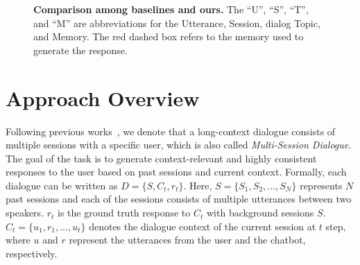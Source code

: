 \documentclass[authoryear,preprint,review,12pt]{elsarticle}
\begin{document}
\begin{figure}[t]
{ }\hspace{.05in}
 \caption{\textbf{Comparison among baselines and ours.} The ``U'', ``S'', ``T'', and ``M'' are abbreviations for the Utterance, Session, dialog Topic, and Memory. The red dashed box refers to the memory used to generate the response.}
 \label{fig:com}
 \end{figure}
\section{Approach Overview}
Following previous works~\citep{xu-etal-2022-beyond, bae-etal-2022-keep}, we denote that a long-context dialogue consists of multiple sessions with a specific user, which is also called \textit{Multi-Session Dialogue}. The goal of the task is to generate context-relevant and highly consistent responses to the user based on past sessions and current context. Formally, each dialogue can be written as $D=\{S,C_t,r_t\}$. Here, $S=\{S_1, S_2, ...,S_N\}$ represents $N$ past sessions and each of the sessions consists of multiple utterances between two speakers. $r_t$ is the ground truth response to $C_t$ with background sessions $S$. $C_t=\{u_1,r_1,...,u_t\}$ denotes the dialogue context of the current session at $t$ step, where $u$ and $r$ represent the utterances from the user and the chatbot, respectively.  
\end{document}
